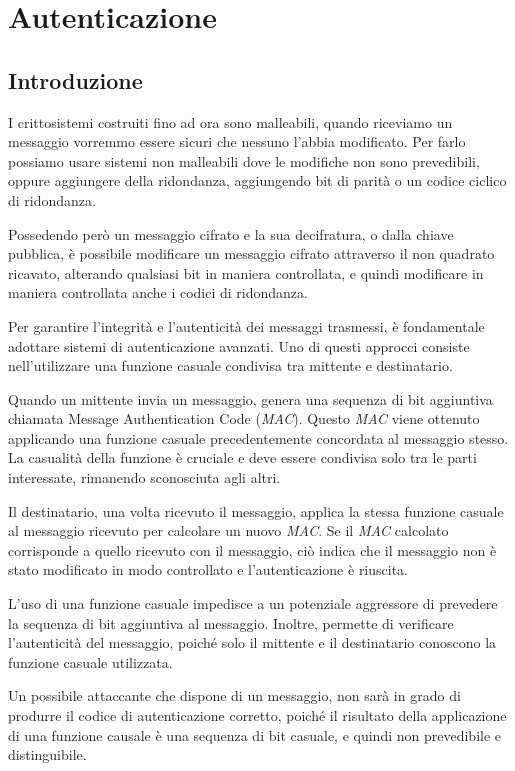 \chapter{Autenticazione}
\section{Introduzione}
I crittosistemi costruiti fino ad ora sono malleabili, quando riceviamo un messaggio vorremmo
essere sicuri che nessuno l'abbia modificato. Per farlo possiamo usare sistemi non malleabili
dove le modifiche non sono prevedibili, oppure aggiungere della ridondanza, aggiungendo
bit di parità o un codice ciclico di ridondanza.

Possedendo però un messaggio cifrato e la sua decifratura, o dalla chiave pubblica,
è possibile modificare un messaggio 
cifrato attraverso il non quadrato ricavato, alterando qualsiasi bit in maniera controllata, e 
quindi modificare in maniera controllata anche i codici di ridondanza.

Per garantire l'integrità e l'autenticità dei messaggi trasmessi, è fondamentale adottare sistemi di autenticazione avanzati. Uno di questi approcci consiste nell'utilizzare una funzione casuale condivisa tra mittente e destinatario.

Quando un mittente invia un messaggio, genera una sequenza di bit aggiuntiva chiamata
Message Authentication Code (\textit{MAC}). Questo \textit{MAC} viene ottenuto applicando una
funzione casuale precedentemente concordata al messaggio stesso. La casualità della
funzione è cruciale e deve essere condivisa solo tra le parti interessate, rimanendo
sconosciuta agli altri.

Il destinatario, una volta ricevuto il messaggio, applica la stessa funzione casuale
al messaggio ricevuto per calcolare un nuovo \textit{MAC}. Se il \textit{MAC} calcolato corrisponde a
quello ricevuto con il messaggio, ciò indica che il messaggio non è stato modificato
in modo controllato e l'autenticazione è riuscita.

L'uso di una funzione casuale impedisce a un potenziale aggressore di prevedere la
sequenza di bit aggiuntiva al messaggio. Inoltre, permette di verificare l'autenticità
del messaggio, poiché solo il mittente e il destinatario conoscono la funzione casuale
utilizzata.

Un possibile attaccante che dispone di un messaggio, non sarà in grado di produrre 
il codice di autenticazione corretto, poiché il risultato della applicazione di una funzione 
causale è una sequenza di bit casuale, e quindi non prevedibile e distinguibile.

